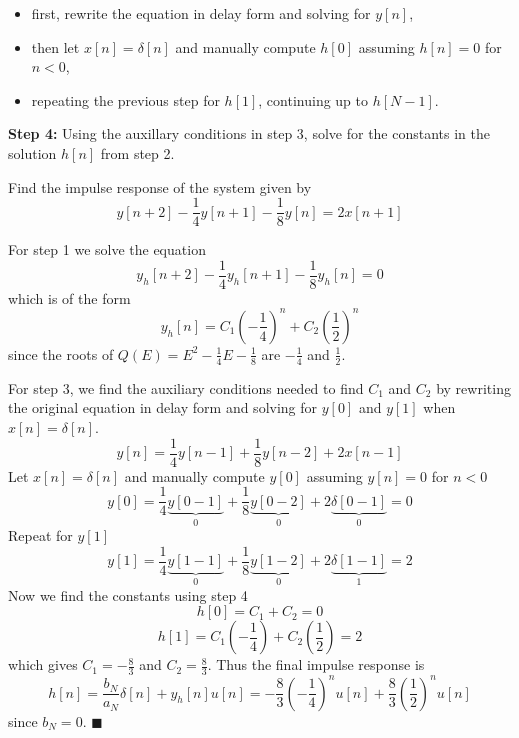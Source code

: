 \begin{itemize}
\item first, rewrite the equation in delay form and solving for $y[n]$,
\item then let $x[n] = \delta[n]$ and manually compute $h[0]$ assuming $h[n] = 0$ for $n < 0$,
\item repeating the previous step for $h[1]$, continuing up to $h[N-1]$.
\end{itemize}

\textbf{Step 4:} Using the auxillary conditions in step 3, solve for the constants in the solution $h[n]$ from step 2.

\begin{example}

  Find the impulse response of the system given by
  \[
  y[n+2] -\frac{1}{4}y[n+1] -\frac{1}{8}y[n]= 2x[n+1]
  \]

  For step 1 we solve the equation
  \[
  y_h[n+2] -\frac{1}{4}y_h[n+1] -\frac{1}{8}y_h[n] = 0
  \]
  which is of the form
  \[
  y_h[n] = C_1 \left( -\frac{1}{4}\right)^n + C_2 \left( \frac{1}{2}\right)^n
  \]
  since the roots of $Q(E) = E^2 - \frac{1}{4}E - \frac{1}{8}$ are $-\frac{1}{4}$ and $\frac{1}{2}$.

  For step 3, we find the auxiliary conditions needed to find $C_1$ and $C_2$ by rewriting the original equation in delay form and solving for $y[0]$ and $y[1]$ when $x[n] = \delta[n]$.
  \[
  y[n] = \frac{1}{4}y[n-1] + \frac{1}{8}y[n-2] + 2x[n-1]
  \]    
  Let $x[n] = \delta[n]$ and manually compute $y[0]$ assuming $y[n] = 0$ for $n < 0$
  \[
  y[0] = \frac{1}{4}\underbrace{y[0-1]}_{0} + \frac{1}{8}\underbrace{y[0-2]}_{0} + 2\underbrace{\delta[0-1]}_{0} = 0
  \]
  Repeat for $y[1]$
  \[
  y[1] = \frac{1}{4}\underbrace{y[1-1]}_{0} + \frac{1}{8}\underbrace{y[1-2]}_{0} + 2\underbrace{\delta[1-1]}_{1} = 2
  \]  
  Now we find the constants using step 4
  \[
  h[0] = C_1  + C_2  = 0
  \]
  \[
  h[1] = C_1 \left( -\frac{1}{4}\right) + C_2 \left( \frac{1}{2}\right) = 2
  \]
  which gives $C_1 = -\frac{8}{3}$ and $C_2 = \frac{8}{3}$. Thus the final impulse response is
  \[
  h[n] = \frac{b_N}{a_N}\delta[n] + y_h[n]u[n] = -\frac{8}{3}\left( -\frac{1}{4}\right)^nu[n] + \frac{8}{3}\left( \frac{1}{2}\right)^n u[n]
  \]
  since $b_N = 0$.
$\blacksquare$
\end{example}

